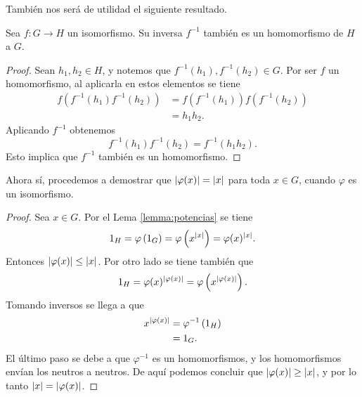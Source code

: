 También nos será de utilidad el siguiente resultado.

\begin{lemma}
    \label{lemma:inversa-homomorfismo}
    Sea \( f: G\to H \) un isomorfismo. Su inversa \( f^{-1} \) también es un homomorfismo
    de \( H \) a \( G \).
\end{lemma}
\begin{proof}
    Sean \( h_1,h_2\in H \), 
    y notemos que \( f^{-1}(h_1), f^{-1}(h_2) \in G \). Por ser \( f \) un homomorfismo, al 
    aplicarla en estos elementos se tiene
    \begin{align*}
        f
        \left( f^{-1} (h_1) f^{-1} ( h_2 ) \right) 
        &=
        f \left( f^{-1} (h_1) \right) 
        f \left( f^{-1}(h_2) \right) \\
        &= h_1 h_2.
    \end{align*}
    Aplicando \( f^{-1} \) obtenemos 
    \[
        f^{-1}(h_1)
        f^{-1}(h_2)
        =
        f^{-1}(h_1h_2).
    \]
    Esto implica que \( f^{-1} \) también es un homomorfismo. 
\end{proof}

Ahora sí, procedemos a demostrar que \( \left\vert \varphi ( x ) \right\vert = \left\vert x \right\vert \)
para toda \( x\in G \), cuando \( \varphi \) es un isomorfismo.
\begin{proof}
    Sea \( x\in G \).
    Por el {Lema \ref{lemma:potencias}} se tiene 
    \[
        1_H = 
        \varphi \left( 1_G \right) =
        \varphi \left( x^{\left\vert x \right\vert} \right) 
        =
        \varphi ( x )^{\left\vert x \right\vert}.
    \]
    Entonces \( \left\vert \varphi(x) \right\vert \leq \left\vert x \right\vert \).
    Por otro lado se tiene también que 
    \[
        1_H = \varphi ( x ) ^{\left\vert \varphi(x) \right\vert}
        =
        \varphi \left( x^{\left\vert \varphi(x) \right\vert} \right).
    \]
    Tomando inversos se llega a que 
    \begin{align*}
        x^{\left\vert \varphi(x) \right\vert}
        &=
        \varphi^{-1} \left( 1_H \right) \\
        &=
        1_G.
    \end{align*}
    El último paso se debe a que \( \varphi^{-1} \) es un homomorfismos, y los homomorfismos
    envían los neutros a neutros.
    De aquí podemos concluir que \( \left\vert \varphi ( x )  \right\vert \geq \left\vert x \right\vert \), y por lo tanto
    \( \left\vert x \right\vert = \left\vert \varphi ( x ) \right\vert \).
\end{proof}
